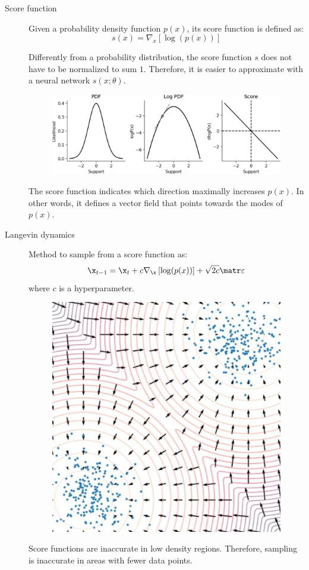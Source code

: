 \begin{description}
    \item[Score function] 
        Given a probability density function $p(x)$, its score function is defined as:
        \[ s(x) = \nabla_x\left[ \log(p(x)) \right] \]

        \begin{remark}
            Differently from a probability distribution, the score function $s$ does not have to be normalized to sum $1$. Therefore, it is easier to approximate with a neural network $s(x; \theta)$.
        \end{remark}

        \begin{figure}[H]
            \centering
            \includegraphics[width=0.65\linewidth]{./img/score_function.jpg}
        \end{figure}

        The score function indicates which direction maximally increases $p(x)$. In other words, it defines a vector field that points towards the modes of $p(x)$.

    \item[Langevin dynamics] 
        Method to sample from a score function as:
        \[ \x_{t-1} = \x_t + c \nabla_\x\left[ \log(p(x)) \right] + \sqrt{2c} \noise \]
        where $c$ is a hyperparameter.

        \begin{figure}[H]
            \centering
            \includegraphics[width=0.3\linewidth]{./img/langevin_dynamics.jpg}
        \end{figure}

        \begin{remark}
            Score functions are inaccurate in low density regions. Therefore, sampling is inaccurate in areas with fewer data points.


\end{remark}
\end{description}

